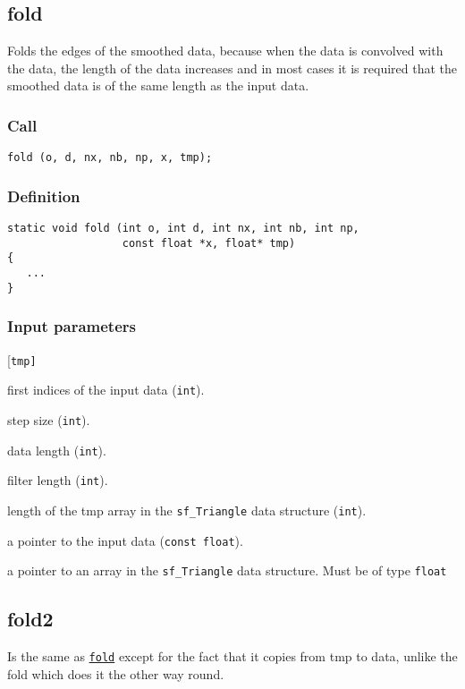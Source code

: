 \subsection{{fold}}\label{sec:fold}
Folds the edges of the smoothed data, because when the data is convolved with the data, the length of the data increases and in most cases it is required that the smoothed data is of the same length as the input data.

\subsubsection*{Call}
\begin{verbatim}fold (o, d, nx, nb, np, x, tmp);\end{verbatim}

\subsubsection*{Definition}
\begin{verbatim}
static void fold (int o, int d, int nx, int nb, int np, 
                  const float *x, float* tmp)
{
   ...
}
\end{verbatim}

\subsubsection*{Input parameters}
\begin{desclist}{\tt }{\quad}[\tt tmp]
   \setlength\itemsep{0pt}
   \item[o]   first indices of the input data (\texttt{int}).  
   \item[d]   step size (\texttt{int}).
   \item[nx]  data length (\texttt{int}).        
   \item[nb]  filter length (\texttt{int}).        
   \item[np]  length of the tmp array in the \texttt{sf\_Triangle} data structure (\texttt{int}).
   \item[x]   a pointer to the input data (\texttt{const float}).  
   \item[tmp] a pointer to an array in the \texttt{sf\_Triangle} data structure. Must be of type \texttt{float}
\end{desclist}




\subsection{{fold2}}\label{sec:fold2}
Is the same as \hyperref[sec:fold]{\texttt{fold}} except for the fact that it copies from tmp to data, unlike the fold which does it the other way round.

